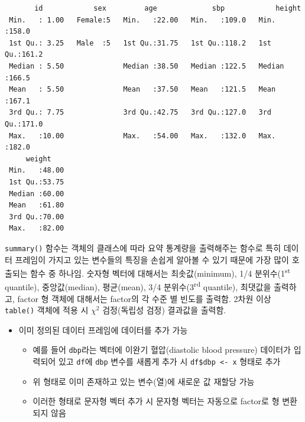 \documentclass[
  11pt,
]{krantz}
\providecommand{\tightlist}{%
  \setlength{\itemsep}{0pt}\setlength{\parskip}{0pt}}
\let\BeginKnitrBlock\begin \let\EndKnitrBlock\end
\begin{document}
\begin{verbatim}
       id            sex         age             sbp            height     
 Min.   : 1.00   Female:5   Min.   :22.00   Min.   :109.0   Min.   :158.0  
 1st Qu.: 3.25   Male  :5   1st Qu.:31.75   1st Qu.:118.2   1st Qu.:161.2  
 Median : 5.50              Median :38.50   Median :122.5   Median :166.5  
 Mean   : 5.50              Mean   :37.50   Mean   :121.5   Mean   :167.1  
 3rd Qu.: 7.75              3rd Qu.:42.75   3rd Qu.:127.0   3rd Qu.:171.0  
 Max.   :10.00              Max.   :54.00   Max.   :132.0   Max.   :182.0  
     weight     
 Min.   :48.00  
 1st Qu.:53.75  
 Median :60.00  
 Mean   :61.80  
 3rd Qu.:70.00  
 Max.   :82.00  
\end{verbatim}

\normalsize

\footnotesize

\BeginKnitrBlock{rmdtip}
\texttt{summary()} 함수는 객체의 클래스에 따라 요약 통계량을 출력해주는 함수로 특히 데이터 프레임이 가지고 있는 변수들의 특징을 손쉽게 알아볼 수 있기 때문에 가장 많이 호출되는 함수 중 하나임. 숫자형 벡터에 대해서는 최솟값(minimum), 1/4 분위수(1\textsuperscript{st} quantile), 중앙값(median), 평균(mean), 3/4 분위수(3\textsuperscript{rd} quantile), 최댓값을 출력하고, factor 형 객체에 대해서는 factor의 각 수준 별 빈도를 출력함. 2차원 이상 \texttt{table()} 객체에 적용 시 \(\chi^2\) 검정(독립성 검정) 결과값을 출력함.
\EndKnitrBlock{rmdtip}

\normalsize

\begin{itemize}
\tightlist
\item
  이미 정의된 데이터 프레임에 데이터를 추가 가능

  \begin{itemize}
  \tightlist
  \item
    예를 들어 \texttt{dbp}라는 벡터에 이완기 혈압(diastolic blood pressure) 데이터가 입력되어 있고 \texttt{df}에 \texttt{dbp} 변수를 새롭게 추가 시 \texttt{df\$dbp\ \textless{}-\ x} 형태로 추가
  \item
    위 형태로 이미 존재하고 있는 변수(열)에 새로운 값 재할당 가능
  \item
    이러한 형태로 문자형 벡터 추가 시 문자형 벡터는 자동으로 factor로 형 변환 되지 않음
  \end{itemize}
\end{itemize}

\footnotesize
\end{document}
